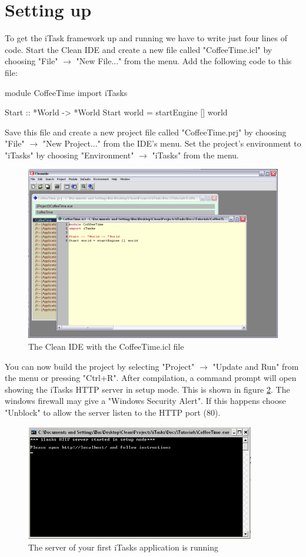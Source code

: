 \documentclass[a4paper,11pt]{article}
\begin{document}
\section{Setting up}
To get the iTask framework up and running we have to write just four lines of code. Start the Clean IDE and create a new file called "CoffeeTime.icl" by choosing  "File" $\rightarrow$ "New File..." from the menu. Add the following code to this file:
\begin{CleanCodeN}
module CoffeeTime
import iTasks

Start :: *World -> *World
Start world = startEngine [] world
\end{CleanCodeN}
Save this file and create a new project file called "CoffeeTime.prj" by choosing "File" $\rightarrow$ "New Project..." from the IDE's menu. Set the project's environment to "iTasks" by choosing "Environment" $\rightarrow$ "iTasks" from the menu.
\begin{figure}[h]
\centerline{\includegraphics[width=12cm]{GettingStarted-img/ide-version1.png}}
\caption{The Clean IDE with the CoffeeTime.icl file} \label{ide-version1}
\end{figure}
You can now build the project by selecting "Project" $\rightarrow$ "Update and Run" from the menu or pressing "Ctrl+R". After compilation, a command prompt will open showing the iTasks HTTP server in setup mode. This is shown in figure \ref{setup-server}.  The windows firewall may give a "Windows Security Alert". If this happens choose "Unblock" to allow the server listen to the HTTP port (80).
\begin{figure}[h]
\centerline{\includegraphics[width=10cm]{GettingStarted-img/setup-server.png}}
\caption{The server of your first iTasks application is running} \label{setup-server}
\end{figure}
\end{document}
